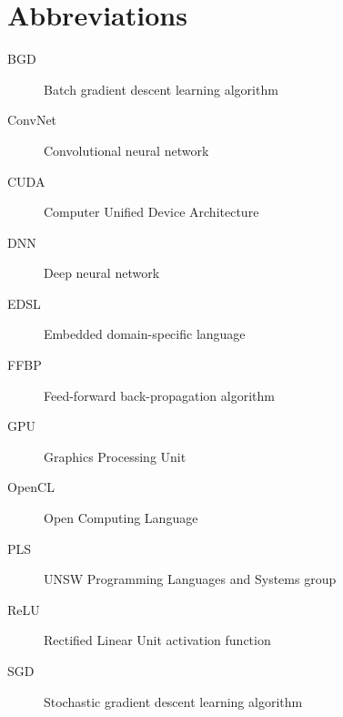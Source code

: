 \chapter*{Abbreviations}\label{abbr}
\begin{description}
\item[BGD] Batch gradient descent learning algorithm
\item[ConvNet] Convolutional neural network
\item[CUDA] Computer Unified Device Architecture
\item[DNN] Deep neural network
\item[EDSL] Embedded domain-specific language
\item[FFBP] Feed-forward back-propagation algorithm
\item[GPU] Graphics Processing Unit
\item[OpenCL] Open Computing Language
\item[PLS] UNSW Programming Languages and Systems group
\item[ReLU] Rectified Linear Unit activation function
\item[SGD] Stochastic gradient descent learning algorithm
\end{description}
